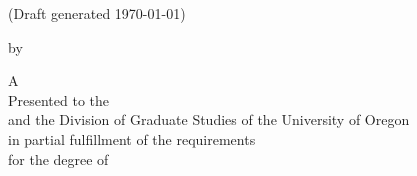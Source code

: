 
   \clearpage
   \thispagestyle{empty}
   {%
   \centering
   \begin{DoubleSpace} \MakeUppercase{\thesistitle}

   \ifdraftdoc
   (Draft generated \today)
    \else
   \relax
    \fi
   \end{DoubleSpace}
   
    \begin{vplace}[1]
    \begin{SingleSpace}
        by \\ \vspace{\onelineskip}
        \MakeUppercase{\thesisauthor}
    \end{SingleSpace}
    \end{vplace}

   \begin{SingleSpace}
   \MakeUppercase{A \thesisdoctype} \\ \vspace{\onelineskip}
   Presented to the \thesisdept \\
   and the Division of Graduate Studies of the University of Oregon \\
   in partial fulfillment of the requirements \\
   for the degree of \\
   \thesisdegree \\ \vspace{\onelineskip}
    \thesisgraddate
   \end{SingleSpace}
   }
   \enlargethispage{\bottafiddle}
   \clearpage